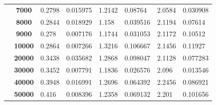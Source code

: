 \documentclass{article}
\begin{document}
\begin{table}[]
\begin{tabular}{|c|c|ll|ll|ll|}
                                           & \textbf{7000}                     & \multicolumn{1}{l|}{0.2798}        & 0.015975                          & \multicolumn{1}{l|}{1.2142}        & 0.08764                           & \multicolumn{1}{l|}{2.0584}        & 0.030908                          \\ \cline{2-8} 
                                           & \textbf{8000}                     & \multicolumn{1}{l|}{0.2844}        & 0.018929                          & \multicolumn{1}{l|}{1.158}         & 0.039516                          & \multicolumn{1}{l|}{2.1194}        & 0.07614                           \\ \cline{2-8} 
                                           & \textbf{9000}                     & \multicolumn{1}{l|}{0.278}         & 0.007176                          & \multicolumn{1}{l|}{1.1744}        & 0.031053                          & \multicolumn{1}{l|}{2.1172}        & 0.10512                           \\ \cline{2-8} 
                                           & \textbf{10000}                    & \multicolumn{1}{l|}{0.2864}        & 0.007266                          & \multicolumn{1}{l|}{1.3216}        & 0.106667                          & \multicolumn{1}{l|}{2.1456}        & 0.11927                           \\ \cline{2-8} 
                                           & \textbf{20000}                    & \multicolumn{1}{l|}{0.3438}        & 0.035682                          & \multicolumn{1}{l|}{1.2868}        & 0.098047                          & \multicolumn{1}{l|}{2.1128}        & 0.077283                          \\ \cline{2-8} 
                                           & \textbf{30000}                    & \multicolumn{1}{l|}{0.3452}        & 0.007791                          & \multicolumn{1}{l|}{1.1836}        & 0.026576                          & \multicolumn{1}{l|}{2.096}         & 0.013546                          \\ \cline{2-8} 
                                           & \textbf{40000}                    & \multicolumn{1}{l|}{0.3948}        & 0.016991                          & \multicolumn{1}{l|}{1.2696}        & 0.064392                          & \multicolumn{1}{l|}{2.2456}        & 0.086921                          \\ \cline{2-8} 
                                           & \textbf{50000}                    & \multicolumn{1}{l|}{0.416}         & 0.008396                          & \multicolumn{1}{l|}{1.2358}        & 0.069132                          & \multicolumn{1}{l|}{2.201}         & 0.101656                          \\ \hline
\end{tabular}
\end{table}
\end{document}
